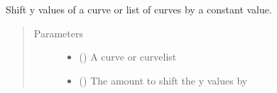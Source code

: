 \documentclass[letterpaper,10pt,english]{sphinxmanual}
\begin{document}

\begin{fulllineitems}
\label{\detokenize{pydv:pydvpy.dy}}
Shift y values of a curve or list of curves by a constant value.

\begin{sphinxVerbatim}[commandchars=\\\{\}]
  
\end{sphinxVerbatim}

\begin{sphinxVerbatim}[commandchars=\\\{\}]
  
\end{sphinxVerbatim}

\begin{sphinxVerbatim}[commandchars=\\\{\}]
\PYG{p}{[}\PYG{p}{]} 
\end{sphinxVerbatim}
\begin{quote}\begin{description}
\item[{Parameters}] \leavevmode\begin{itemize}
\item {} 
 ({\hyperref[\detokenize{pydv:curve.Curve}]{}}) \textendash{} A curve or curvelist

\item {} 
 () \textendash{} The amount to shift the y values by

\end{itemize}

\end{description}\end{quote}

\end{fulllineitems}
\end{document}
